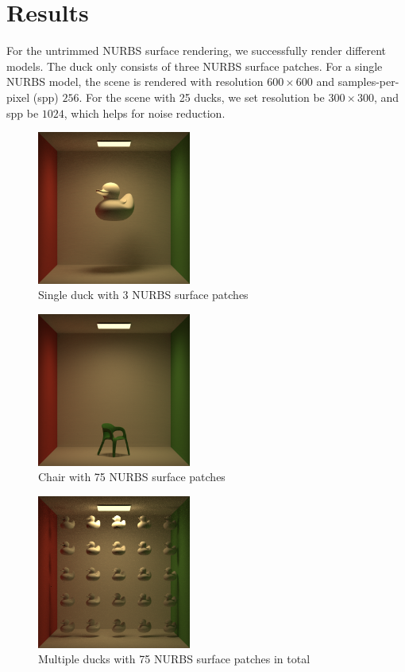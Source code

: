 \documentclass[acmtog]{acmart}
\begin{document}
\section{Results}
For the untrimmed NURBS surface rendering, we successfully render different models. The duck only consists of three NURBS surface patches. For a single NURBS model, the scene is rendered with resolution $600\times 600$ and samples-per-pixel (spp) $256$. For the scene with 25 ducks, we set resolution be $300\times 300$, and spp be $1024$, which helps for noise reduction.
\begin{figure}[htbp]
    \centering
    \includegraphics[width=0.45\textwidth]{../results/duck.png}
    \caption{Single duck with 3 NURBS surface patches}
\end{figure}
\begin{figure}
    \centering
    \includegraphics[width=0.45\textwidth]{../results/chair.png}
    \caption{Chair with 75 NURBS surface patches}
\end{figure}
\begin{figure}
    \centering
    \includegraphics[width=0.45\textwidth]{../results/multi-duck.png}
    \caption{Multiple ducks with 75 NURBS surface patches in total}
\end{figure}
\end{document}
